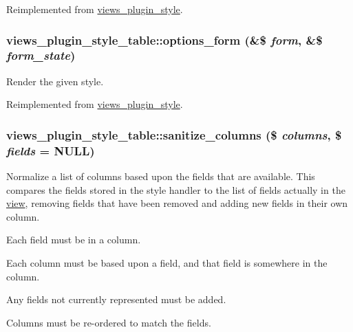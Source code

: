 Reimplemented from \hyperlink{classviews__plugin__style_af9009e2a5f50ea90d9f02adeba4b711c}{views\_\-plugin\_\-style}.\hypertarget{classviews__plugin__style__table_a732752fb9b74bdb48673cb9ff4150be9}{
\subsubsection[{options\_\-form}]{\setlength{\rightskip}{0pt plus 5cm}views\_\-plugin\_\-style\_\-table::options\_\-form (\&\$ {\em form}, \/  \&\$ {\em form\_\-state})}}
\label{classviews__plugin__style__table_a732752fb9b74bdb48673cb9ff4150be9}
Render the given style. 

Reimplemented from \hyperlink{classviews__plugin__style_afe3d437ff4398315b15c4e60975dbb1c}{views\_\-plugin\_\-style}.\hypertarget{classviews__plugin__style__table_a1ab90a2782f6061d998a6db033100fdc}{
\subsubsection[{sanitize\_\-columns}]{\setlength{\rightskip}{0pt plus 5cm}views\_\-plugin\_\-style\_\-table::sanitize\_\-columns (\$ {\em columns}, \/  \$ {\em fields} = {\ttfamily NULL})}}
\label{classviews__plugin__style__table_a1ab90a2782f6061d998a6db033100fdc}
Normalize a list of columns based upon the fields that are available. This compares the fields stored in the style handler to the list of fields actually in the \hyperlink{classview}{view}, removing fields that have been removed and adding new fields in their own column.


\begin{DoxyItemize}
\item Each field must be in a column.
\item Each column must be based upon a field, and that field is somewhere in the column.
\item Any fields not currently represented must be added.
\item Columns must be re-\/ordered to match the fields.
\end{DoxyItemize}


